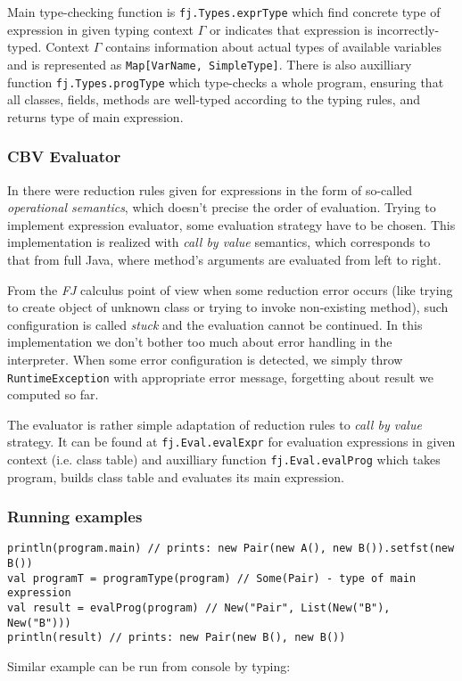 \documentclass{article}[12pt]
\begin{document}
Main type-checking function is \texttt{fj.Types.exprType} which
find concrete type of expression in given typing context $\Gamma$
or indicates that expression is incorrectly-typed. Context
$\Gamma$ contains information about actual types of available
variables and is represented as \texttt{Map[VarName, SimpleType]}.
There is also auxilliary function \texttt{fj.Types.progType} which
type-checks a whole program, ensuring that all classes, fields,
methods are well-typed according to the typing rules, and returns
type of main expression.

\subsubsection{CBV Evaluator}

In \cite{fj} there were reduction rules given for expressions in
the form of so-called \emph{operational semantics}, which doesn't
precise the order of evaluation. Trying to implement expression
evaluator, some evaluation strategy have to be chosen. This
implementation is realized with \emph{call by value} semantics,
which corresponds to that from full Java, where method's arguments
are evaluated from left to right.

From the \emph{FJ} calculus point of view when some reduction error
occurs (like trying to create object of unknown class or trying to
invoke non-existing method), such configuration is called \emph{stuck}
and the evaluation cannot be continued. In this implementation we
don't bother too much about error handling in the interpreter.
When some error configuration is detected, we simply throw
\texttt{RuntimeException} with appropriate error message, forgetting
about result we computed so far.

The evaluator is rather simple adaptation of reduction rules to
\emph{call by value} strategy. It can be found at
\texttt{fj.Eval.evalExpr} for evaluation expressions in given
context (i.e. class table) and auxilliary function
\texttt{fj.Eval.evalProg} which takes program, builds class table
and evaluates its main expression.

\subsubsection{Running examples}

\begin{verbatim}
println(program.main) // prints: new Pair(new A(), new B()).setfst(new B())
val programT = programType(program) // Some(Pair) - type of main expression
val result = evalProg(program) // New("Pair", List(New("B"), New("B")))
println(result) // prints: new Pair(new B(), new B())
\end{verbatim}
Similar example can be run from console by typing:
\end{document}
